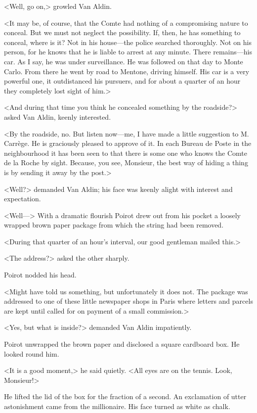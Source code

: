 <Well, go on,> growled Van Aldin.

<It may be, of course, that the Comte had nothing of a compromising nature to conceal. But we must not neglect the possibility. If, then, he has something to conceal, where is it? Not in his house—the police searched thoroughly. Not on his person, for he knows that he is liable to arrest at any minute. There remains—his car. As I say, he was under surveillance. He was followed on that day to Monte Carlo. From there he went by road to Mentone, driving himself. His car is a very powerful one, it outdistanced his pursuers, and for about a quarter of an hour they completely lost sight of him.>

<And during that time you think he concealed something by the roadside?> asked Van Aldin, keenly interested.

<By the roadside, no.  But listen now—me, I have made a little suggestion to M. Carrège. He is graciously pleased to approve of it. In each Bureau de Poste in the neighbourhood it has been seen to that there is some one who knows the Comte de la Roche by sight. Because, you see, Monsieur, the best way of hiding a thing is by sending it away by the post.>

<Well?> demanded Van Aldin; his face was keenly alight with interest and expectation.

<Well—> With a dramatic flourish Poirot drew out from his pocket a loosely wrapped brown paper package from which the string had been removed.

<During that quarter of an hour's interval, our good gentleman mailed this.>

<The address?> asked the other sharply.

Poirot nodded his head.

<Might have told us something, but unfortunately it does not. The package was addressed to one of these little newspaper shops in Paris where letters and parcels are kept until called for on payment of a small commission.>

<Yes, but what is inside?> demanded Van Aldin impatiently.

Poirot unwrapped the brown paper and disclosed a square cardboard box. He looked round him.

<It is a good moment,> he said quietly. <All eyes are on the tennis. Look, Monsieur!>

He lifted the lid of the box for the fraction of a second. An exclamation of utter astonishment came from the millionaire. His face turned as white as chalk.

